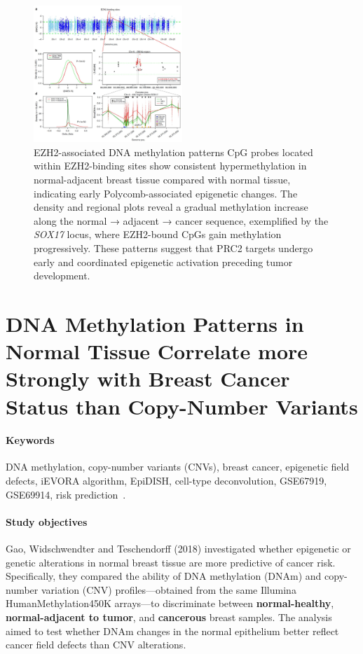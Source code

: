 \documentclass[10pt]{extarticle}
\begin{document}
\begin{figure}[H]
    \centering
    \includegraphics[width=0.5\textwidth]{Figures/Enrichment of EZH2 TF-binding sites among DNA methylation field defects..jpg} %
    \caption{EZH2-associated DNA methylation patterns
CpG probes located within EZH2-binding sites show consistent hypermethylation in normal-adjacent breast tissue compared with normal tissue, indicating early Polycomb-associated epigenetic changes. The density and regional plots reveal a gradual methylation increase along the normal → adjacent → cancer sequence, exemplified by the \textit{SOX17} locus, where EZH2-bound CpGs gain methylation progressively. These patterns suggest that PRC2 targets undergo early and coordinated epigenetic activation preceding tumor development.}
    \label{fig:DNA_methylation_patters}
\end{figure}


\section{DNA Methylation Patterns in Normal Tissue Correlate more Strongly with Breast Cancer Status than Copy-Number Variants}

\paragraph{Keywords}
DNA methylation, copy-number variants (CNVs), breast cancer, epigenetic field defects, iEVORA algorithm, EpiDISH, cell-type deconvolution, GSE67919, GSE69914, risk prediction~\cite{gao2018dnamethylation}.

\paragraph{Study objectives}
Gao, Widschwendter and Teschendorff (2018) investigated whether epigenetic or genetic alterations in normal breast tissue are more predictive of cancer risk. Specifically, they compared the ability of DNA methylation (DNAm) and copy-number variation (CNV) profiles—obtained from the same Illumina HumanMethylation450K arrays—to discriminate between \textbf{normal-healthy}, \textbf{normal-adjacent to tumor}, and \textbf{cancerous} breast samples. The analysis aimed to test whether DNAm changes in the normal epithelium better reflect cancer field defects than CNV alterations.
\end{document}
